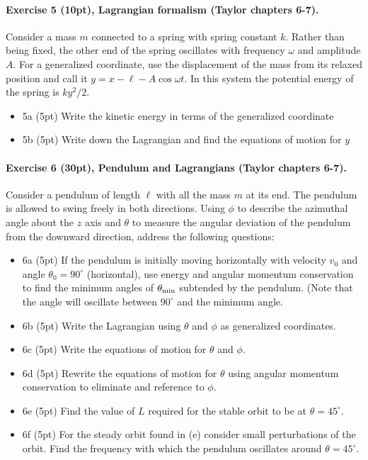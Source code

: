 \documentclass[%
oneside,                 %
final,                   %
10pt]{article}
\begin{document}
\paragraph{Exercise 5 (10pt), Lagrangian formalism (Taylor chapters 6-7).}
Consider a mass $m$ connected to a spring with spring constant $k$. Rather than being fixed, the other end of the spring oscillates with frequency $\omega$ and amplitude $A$. For a generalized coordinate, use the displacement of the mass from its relaxed position and call it $y=x-\ell-A\cos\omega t$. In this system the potential energy of the spring is $ky^2/2$.

\begin{itemize}
\item 5a (5pt) Write the kinetic energy in terms of the generalized coordinate

\item 5b (5pt) Write down the Lagrangian and find the equations of motion for $y$
\end{itemize}

\noindent
\paragraph{Exercise 6 (30pt), Pendulum and Lagrangians (Taylor chapters 6-7).}
Consider a pendulum of length $\ell$ with all the mass $m$ at its end. The pendulum is allowed to swing freely in both directions. Using $\phi$ to describe the azimuthal angle about the $z$ axis and $\theta$ to measure the angular deviation of the pendulum from the downward direction, address the following questions:

\begin{itemize}
\item 6a (5pt) If the pendulum is initially moving horizontally with velocity $v_0$ and angle $\theta_0=90^\circ$ (horizontal), use energy and angular momentum conservation to find the minimum angles of $\theta_{\rm min}$ subtended by the pendulum. (Note that the angle  will oscillate between $90^\circ$ and the minimum angle.

\item 6b (5pt) Write the Lagrangian using $\theta$ and $\phi$ as generalized coordinates.

\item 6c (5pt) Write the equations of motion for $\theta$ and $\phi$.

\item 6d (5pt) Rewrite the equations of motion for $\theta$ using angular momentum conservation to eliminate and reference to $\phi$.

\item 6e (5pt) Find the value of $L$ required for the stable orbit to be at $\theta=45^\circ$.

\item 6f (5pt)  For the steady orbit found in (e) consider small perturbations of the orbit. Find the frequency with which the pendulum oscillates around $\theta=45^\circ$.
\end{itemize}

\noindent


\end{document}
